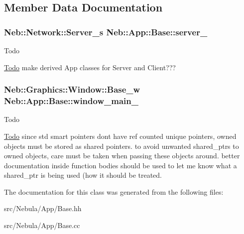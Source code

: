 \subsection{\-Member \-Data \-Documentation}
\hypertarget{classNeb_1_1App_1_1Base_a347da33116990d3f31246d0d09b520bb}{
\subsubsection[{server\-\_\-}]{\setlength{\rightskip}{0pt plus 5cm}\-Neb\-::\-Network\-::\-Server\-\_\-s {\bf \-Neb\-::\-App\-::\-Base\-::server\-\_\-}}}\label{classNeb_1_1App_1_1Base_a347da33116990d3f31246d0d09b520bb}
\begin{DoxyRefDesc}{\-Todo}
\item[\hyperlink{todo__todo000007}{\-Todo}]make derived \-App classes for \-Server and \-Client??? \end{DoxyRefDesc}
\hypertarget{classNeb_1_1App_1_1Base_a4a6527469072e5d1f01f76215b6b2fd3}{
\subsubsection[{window\-\_\-main\-\_\-}]{\setlength{\rightskip}{0pt plus 5cm}\-Neb\-::\-Graphics\-::\-Window\-::\-Base\-\_\-w {\bf \-Neb\-::\-App\-::\-Base\-::window\-\_\-main\-\_\-}}}\label{classNeb_1_1App_1_1Base_a4a6527469072e5d1f01f76215b6b2fd3}
\begin{DoxyRefDesc}{\-Todo}
\item[\hyperlink{todo__todo000006}{\-Todo}]since std smart pointers dont have ref counted unique pointers, owned objects must be stored as shared pointers. to avoid unwanted shared\-\_\-ptrs to owned objects, care must be taken when passing these objects around. better documentation inside function bodies should be used to let me know what a shared\-\_\-ptr is being used (how it should be treated. \end{DoxyRefDesc}


\-The documentation for this class was generated from the following files\-:\begin{DoxyCompactItemize}
\item 
src/\-Nebula/\-App/\-Base.\-hh\item 
src/\-Nebula/\-App/\-Base.\-cc\end{DoxyCompactItemize}
